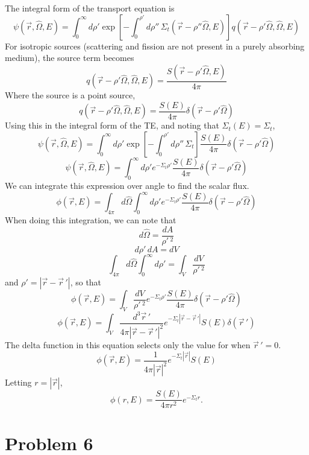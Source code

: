 \documentclass{article}
\newcommand{\Xs}{\Sigma}
\newcommand{\pos}{\vec{r}}
\newcommand{\Oh}{\hat{\Omega}}
\newcommand{\intfp}{\int_{4\pi}}
\newcommand{\intzi}{\int_0^{\infty}}
\begin{document}
The integral form of the transport equation is
$$ \psi(\pos,\Oh,E) = \intzi d\rho' \exp \left[ -\int_0^{\rho'} d\rho'' \, \Xs_t(\pos-\rho''\Oh,E)\right] q(\pos-\rho'\Oh,\Oh,E) $$
For isotropic sources (scattering and fission are not present in a purely absorbing medium), the source term becomes
$$ q(\pos-\rho'\Oh,\Oh,E) = \frac{S(\pos-\rho'\Oh,E)}{4\pi} $$
Where the source is a point source, 
$$ q(\pos-\rho'\Oh,\Oh,E) = \frac{S(E)}{4\pi}\delta(\pos-\rho'\Oh) $$
Using this in the integral form of the TE, and noting that $\Xs_t(E) = \Xs_t$,
$$ \psi(\pos,\Oh,E) = \intzi d\rho' \exp \left[ -\int_0^{\rho'} d\rho'' \, \Xs_t \right] \frac{S(E)}{4\pi}\delta(\pos-\rho'\Oh) $$
$$ \psi(\pos,\Oh,E) = \intzi d\rho' e^{-\Xs_t \rho'} \frac{S(E)}{4\pi}\delta(\pos-\rho'\Oh) $$
We can integrate this expression over angle to find the scalar flux.
$$ \phi(\pos,E) = \intfp d\Oh \intzi d\rho' e^{-\Xs_t \rho'} \frac{S(E)}{4\pi}\delta(\pos-\rho'\Oh) $$
When doing this integration, we can note that
$$ d\Oh = \frac{dA}{\rho'\,^2} $$
$$ d\rho' \, dA = dV $$
$$ \intfp d\Oh \intzi d\rho' = \int_V \frac{dV}{\rho'\, ^2} $$
and $\rho' = |\pos - \pos\,'|$, so that
$$ \phi(\pos,E) = \int_V \frac{dV}{\rho'\, ^2} e^{-\Xs_t \rho'} \frac{S(E)}{4\pi}\delta(\pos-\rho'\Oh) $$
$$ \phi(\pos,E) = \int_V \frac{d^3 \pos\,'}{4\pi |\pos-\pos\,'|^2} e^{-\Xs_t |\pos - \pos\,'|}S(E)\delta(\pos\,') $$
The delta function in this equation selects only the value for when $\pos\,' = 0$. 
$$ \phi(\pos,E) = \frac{1}{4\pi |\pos|^2} e^{-\Xs_t |\pos|}S(E) $$
Letting $r = |\pos|$,
$$\boxed{ \phi(r,E) = \frac{S(E)}{4\pi r^2} e^{-\Xs_t r} }.$$




\section*{Problem 6}
\end{document}
